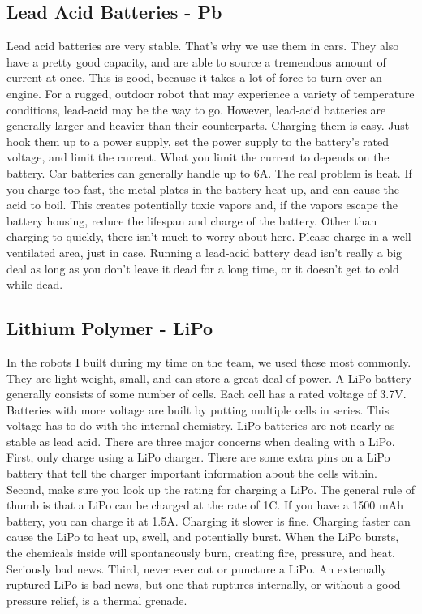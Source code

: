 \subsection{Lead Acid Batteries - Pb}

Lead acid batteries are very stable. That's why we use them in cars. They also have a pretty good capacity, and are able to source a tremendous amount of current at once. This is good, because it takes a lot of force to turn over an engine. For a rugged, outdoor robot that may experience a variety of temperature conditions, lead-acid may be the way to go. However, lead-acid batteries are generally larger and heavier than their counterparts. Charging them is easy. Just hook them up to a power supply, set the power supply to the battery's rated voltage, and limit the current. What you limit the current to depends on the battery. Car batteries can generally handle up to 6A. The real problem is heat. If you charge too fast, the metal plates in the battery heat up, and can cause the acid to boil. This creates potentially toxic vapors and, if the vapors escape the battery housing, reduce the lifespan and charge of the battery. Other than charging to quickly, there isn't much to worry about here. Please charge in a well-ventilated area, just in case. Running a lead-acid battery dead isn't really a big deal as long as you don't leave it dead for a long time, or it doesn't get to cold while dead.

\subsection{Lithium Polymer - LiPo}

In the robots I built during my time on the team, we used these most commonly. They are light-weight, small, and can store a great deal of power. A LiPo battery generally consists of some number of cells. Each cell has a rated voltage of 3.7V. Batteries with more voltage are built by putting multiple cells in series. This voltage has to do with the internal chemistry. LiPo batteries are not nearly as stable as lead acid. There are three major concerns when dealing with a LiPo. First, only charge using a LiPo charger. There are some extra pins on a LiPo battery that tell the charger important information about the cells within. Second, make sure you look up the rating for charging a LiPo. The general rule of thumb is that a LiPo can be charged at the rate of 1C. If you have a 1500 mAh battery, you can charge it at 1.5A. Charging it slower is fine. Charging faster can cause the LiPo to heat up, swell, and potentially burst. When the LiPo bursts, the chemicals inside will spontaneously burn, creating fire, pressure, and heat. Seriously bad news. Third, never ever cut or puncture a LiPo. An externally ruptured LiPo is bad news, but one that ruptures internally, or without a good pressure relief, is a thermal grenade.

